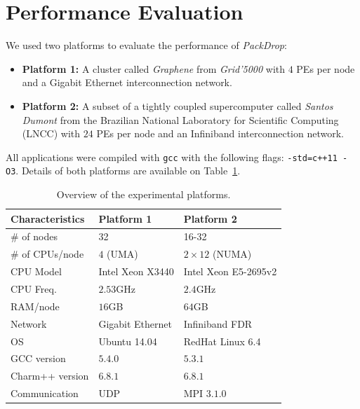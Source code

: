 \section{Performance Evaluation} \label{sec:eval}

We used two platforms to evaluate the performance of \textit{PackDrop}:

\begin{itemize}
	\item \textbf{Platform 1:} A cluster called \textit{Graphene} from \textit{Grid'5000} with $4$ PEs per node and  a Gigabit Ethernet interconnection network.
	\item \textbf{Platform 2:} A subset of a tightly coupled supercomputer called \textit{Santos Dumont} from the Brazilian National Laboratory for Scientific Computing (LNCC) with $24$ PEs per node and an Infiniband interconnection network.%
\end{itemize}

All applications were compiled with {\small\texttt{gcc}} with the following flags: {\small\texttt{-std=c++11 -O3}}. Details of both platforms are available on Table~\ref{tab:ptinfo}.

\begin{table}[t]
    \centering
    	\caption{Overview of the experimental platforms.}
	\begin{tabular}{lll}
	\toprule
	\textbf{Characteristics}	& \textbf{Platform 1} 		& \textbf{Platform 2}	\\
	\midrule
	\# of nodes	   		& 32 					& 16-32 \\
        \# of CPUs/node	   	& $4$ (UMA) 			& $2\times12$ (NUMA) \\
        CPU Model			& Intel Xeon X3440 		& Intel Xeon E5-2695v2 \\
        CPU Freq.  			& $2.53$GHz			& $2.4$GHz \\
        RAM/node    			& $16$GB				& $64$GB	 \\
        Network 				& Gigabit Ethernet		& Infiniband FDR \\
        OS      				& Ubuntu 14.04			& RedHat Linux 6.4 \\
        GCC	version			& $5.4.0$				& $5.3.1$	\\
        Charm++ version		& $6.8.1$				& $6.8.1$ 	\\
        Communication		& UDP				& MPI $3.1.0$	\\
        \bottomrule
	\end{tabular}
    \label{tab:ptinfo}
\end{table}

